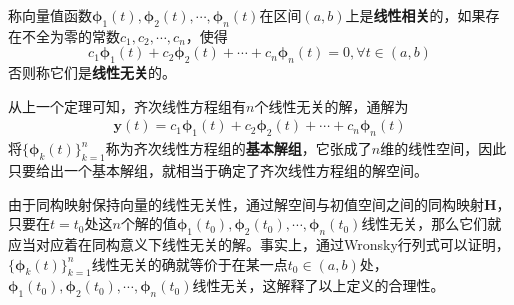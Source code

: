 \documentclass{ctexbook}
\begin{document}
\begin{definition}
    称向量值函数$\boldsymbol{\phi}_1(t),\boldsymbol{\phi}_2(t),\cdots,\boldsymbol{\phi}_n(t)$在区间$(a,b)$上是\textbf{线性相关}的，如果存在不全为零的常数$c_1,c_2,\cdots,c_n$，使得
    \[c_1\boldsymbol{\phi}_1(t)+c_2\boldsymbol{\phi}_2(t)+\cdots+c_n\boldsymbol{\phi}_n(t)=0,\forall t\in(a,b)\]
    否则称它们是\textbf{线性无关}的。
\end{definition}

从上一个定理可知，齐次线性方程组有$n$个线性无关的解，通解为\begin{align*}
    \mathbf{y}(t)=c_1\boldsymbol{\phi}_1(t)+c_2\boldsymbol{\phi}_2(t)+\cdots+c_n\boldsymbol{\phi}_n(t)
\end{align*}
将$\{\boldsymbol{\phi}_k(t)\}_{k=1}^n$称为齐次线性方程组的\textbf{基本解组}，它张成了$n$维的线性空间，因此只要给出一个基本解组，就相当于确定了齐次线性方程组的解空间。

由于同构映射保持向量的线性无关性，通过解空间与初值空间之间的同构映射$\mathbf{H}$，只要在$t=t_0$处这$n$个解的值$\boldsymbol{\phi}_1(t_0),\boldsymbol{\phi}_2(t_0),\cdots,\boldsymbol{\phi}_n(t_0)$线性无关，那么它们就应当对应着在同构意义下线性无关的解。事实上，通过Wronsky行列式可以证明，$\{\boldsymbol{\phi}_k(t)\}_{k=1}^n$线性无关的确就等价于在某一点$t_0\in(a,b)$处，$\boldsymbol{\phi}_1(t_0),\boldsymbol{\phi}_2(t_0),\cdots,\boldsymbol{\phi}_n(t_0)$线性无关，这解释了以上定义的合理性。
\end{document}
